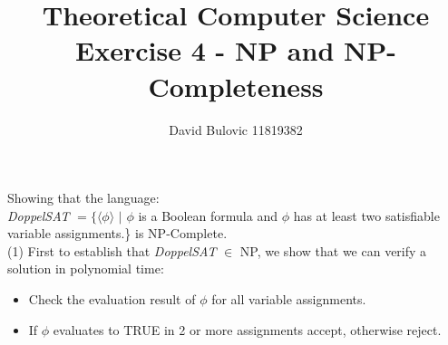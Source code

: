 \documentclass{article}
\title {Theoretical Computer Science\\Exercise 4 - NP and NP-Completeness}
\author {David Bulovic 11819382}
\begin{document}
\maketitle

Showing that the language: \\
\textit{DoppelSAT} \begin{math} = \{ \langle \phi \rangle\end{math} \begin{math}|\end{math} \begin{math}\phi \end{math}
is a Boolean formula and \begin{math} \phi \end{math} has at least two satisfiable variable assignments.\} is NP-Complete. \\

(1) First to establish that \textit{DoppelSAT} \begin{math} \in \end{math} NP, we show that we can verify a solution in polynomial time:
\begin{itemize}
\item Check the evaluation result of \begin{math} \phi \end{math} for all variable assignments.
\item If \begin{math} \phi \end{math} evaluates to TRUE in 2 or more assignments accept, otherwise reject.
\end{itemize} 
\end{document}
